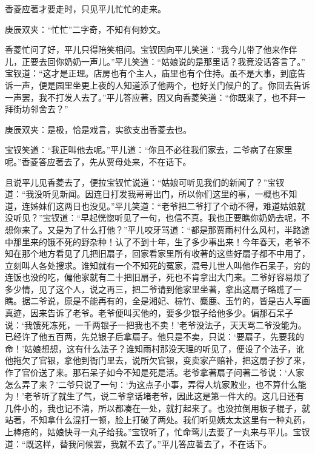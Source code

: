 \begin{parag}
    香菱应著才要走时，只见平儿忙忙的走来。\begin{note}庚辰双夹：“忙忙”二字奇，不知有何妙文。\end{note}香菱忙问了好，平儿只得陪笑相问。宝钗因向平儿笑道：“我今儿带了他来作伴儿，正要去回你奶奶一声儿。”平儿笑道：“姑娘说的是那里话？我竟没话答言了。” 宝钗道：“这才是正理。店房也有个主人，庙里也有个住持。虽不是大事，到底告诉一声，便是园里坐更上夜的人知道添了他两个，也好关门候户的了。你回去告诉一声罢，我不打发人去了。”平儿答应著，因又向香菱笑道：“你既来了，也不拜一拜街坊邻舍去？”\begin{note}庚辰双夹：是极，恰是戏言，实欲支出香菱去也。\end{note}宝钗笑道：“我正叫他去呢。”平儿道：“你且不必往我们家去，二爷病了在家里呢。”香菱答应著去了，先从贾母处来，不在话下。
\end{parag}


\begin{parag}
    且说平儿见香菱去了，便拉宝钗忙说道：“姑娘可听见我们的新闻了？”宝钗道：“我没听见新闻。因连日打发我哥哥出门，所以你们这里的事，一概也不知道，连姊妹们这两日也没见。”平儿笑道：“老爷把二爷打了个动不得，难道姑娘就没听见？”宝钗道：“早起恍惚听见了一句，也信不真。我也正要瞧你奶奶去呢，不想你来了。又是为了什么打他？”平儿咬牙骂道：“都是那贾雨村什么风村，半路途中那里来的饿不死的野杂种！认了不到十年，生了多少事出来！今年春天，老爷不知在那个地方看见了几把旧扇子，回家看家里所有收著的这些好扇子都不中用了，立刻叫人各处搜求。谁知就有一个不知死的冤家，混号儿世人叫他作石呆子，穷的连饭也没的吃，偏他家就有二十把旧扇子，死也不肯拿出大门来。二爷好容易烦了多少情，见了这个人，说之再三，把二爷请到他家里坐著，拿出这扇子略瞧了一瞧。据二爷说，原是不能再有的，全是湘妃、棕竹、麋鹿、玉竹的，皆是古人写画真迹，因来告诉了老爷。老爷便叫买他的，要多少银子给他多少。偏那石呆子说：‘我饿死冻死，一千两银子一把我也不卖！’老爷没法子，天天骂二爷没能为。已经许了他五百两，先兑银子后拿扇子。他只是不卖，只说：‘要扇子，先要我的命！’姑娘想想，这有什么法子？谁知雨村那没天理的听见了，便设了个法子，讹他拖欠了官银，拿他到衙门里去，说所欠官银，变卖家产赔补，把这扇子抄了来，作了官价送了来。那石呆子如今不知是死是活。老爷拿著扇子问著二爷说：‘人家怎么弄了来？’二爷只说了一句：‘为这点子小事，弄得人坑家败业，也不算什么能为！’老爷听了就生了气，说二爷拿话堵老爷，因此这是第一件大的。这几日还有几件小的，我也记不清，所以都凑在一处，就打起来了。也没拉倒用板子棍子，就站著，不知拿什么混打一顿，脸上打破了两处。我们听见姨太太这里有一种丸药，上棒疮的，姑娘快寻一丸子给我。”宝钗听了，忙命莺儿去要了一丸来与平儿。宝钗道：“既这样，替我问候罢，我就不去了。”平儿答应著去了，不在话下。
\end{parag}



